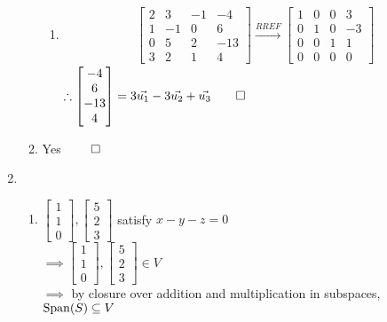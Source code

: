 \documentclass[12pt, a4paper]{article}
\begin{document}
\begin{enumerate}[Q\arabic*.]
\begin{enumerate}[(\alph*)]
\begin{enumerate}[(\roman*)]
        \item 
          \begin{align*}
            \begin{bmatrix}
              2 & 3 & -1 & -4\\
              1 & -1 & 0 & 6\\
              0 & 5 & 2 & -13\\
              3 & 2 & 1 & 4
            \end{bmatrix}\xrightarrow{RREF}
            \begin{bmatrix}
              1 & 0 & 0 & 3\\
              0 & 1 & 0 & -3\\
              0 & 0 & 1 & 1\\
              0 & 0 & 0 & 0
            \end{bmatrix}
          \end{align*}
          $\therefore \begin{bmatrix}-4\\6\\-13\\4\end{bmatrix} = 3\vec{u_1} - 3\vec{u_2} + \vec{u_3} \qed$
        \end{enumerate}
      \item Yes $\qed$
    \end{enumerate}
  \pagebreak 
  \item 
    \begin{enumerate}[(\alph*)]
    \item 
        $\begin{bmatrix}1\\1\\0\end{bmatrix}, \begin{bmatrix}5\\2\\3\end{bmatrix}$ satisfy $x-y-z=0$\\
        $\implies \begin{bmatrix}1\\1\\0\end{bmatrix}, \begin{bmatrix}5\\2\\3\end{bmatrix} \in V$\\
        $\implies$ by closure over addition and multiplication in subspaces, $\operatorname{Span}(S) \subseteq V$\\

\end{enumerate}
\end{enumerate}
\end{document}
